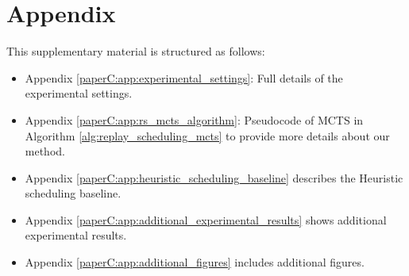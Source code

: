 

\section*{Appendix}
This supplementary material is structured as follows: 
\begin{itemize}[noitemsep]
	\item Appendix \ref{paperC:app:experimental_settings}: Full details of the experimental settings.
	\item Appendix \ref{paperC:app:rs_mcts_algorithm}: Pseudocode of MCTS in Algorithm \ref{alg:replay_scheduling_mcts} to provide more details about our method. 
	\item Appendix \ref{paperC:app:heuristic_scheduling_baseline} describes the Heuristic scheduling baseline.
	\item Appendix \ref{paperC:app:additional_experimental_results} shows additional experimental results. 
	\item Appendix \ref{paperC:app:additional_figures} includes additional figures. 
\end{itemize}




%
%

%









\clearpage



\clearpage



